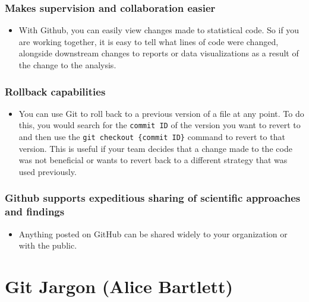 \documentclass[
]{book}
\providecommand{\tightlist}{%
  \setlength{\itemsep}{0pt}\setlength{\parskip}{0pt}}
\begin{document}
\hypertarget{makes-supervision-and-collaboration-easier}{%
\subsection{Makes supervision and collaboration easier}\label{makes-supervision-and-collaboration-easier}}

\begin{itemize}
\tightlist
\item
  With Github, you can easily view changes made to statistical code. So if
  you are working together, it is easy to tell what lines of code were changed,
  alongside downstream changes to reports or data visualizations as a result of the
  change to the analysis.
\end{itemize}

\hypertarget{rollback-capabilities}{%
\subsection{Rollback capabilities}\label{rollback-capabilities}}

\begin{itemize}
\tightlist
\item
  You can use Git to roll back to a previous version of a file at any point. To do this, you would search for the \texttt{commit\ ID} of the version you want to revert to and then use the \texttt{git\ checkout\ \{commit\ ID\}} command to revert to that version. This is useful if your team decides that a change made to the code was not beneficial or wants to revert back to a different strategy that was used previously.
\end{itemize}

\hypertarget{github-supports-expeditious-sharing-of-scientific-approaches-and-findings}{%
\subsection{Github supports expeditious sharing of scientific approaches and findings}\label{github-supports-expeditious-sharing-of-scientific-approaches-and-findings}}

\begin{itemize}
\tightlist
\item
  Anything posted on GitHub can be shared widely to your organization or with
  the public.
\end{itemize}

\hypertarget{git-jargon-alice-bartlett}{%
\chapter{Git Jargon (Alice Bartlett)}\label{git-jargon-alice-bartlett}}
\end{document}
